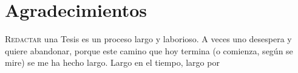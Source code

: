 \pagestyle{empty}
\section*{Agradecimientos}
\lettrine[lraise=0.1, nindent=0em, slope=-.5em]{R}{edactar} una Tesis es un proceso largo y laborioso. A veces uno desespera y quiere abandonar, porque este camino que hoy termina (o comienza, según se mire) se me ha hecho largo. Largo en el tiempo, largo por 

\cleardoublepage